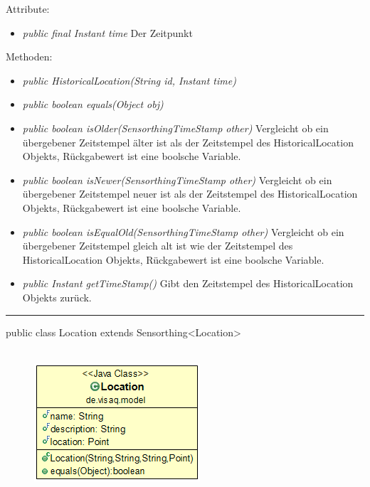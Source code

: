 Attribute:
\begin{itemize} 
	\item \emph{public final Instant time} Der Zeitpunkt
\end{itemize}
Methoden:
\begin{itemize} 
	\item \emph{public HistoricalLocation(String id, Instant time)} 
	\item \emph{public boolean equals(Object obj)} 
	\item \emph{public boolean isOlder(SensorthingTimeStamp other)} Vergleicht ob ein übergebener Zeitstempel älter ist als der Zeitstempel des HistoricalLocation Objekts, Rückgabewert ist eine boolsche Variable.
	\item \emph{public boolean isNewer(SensorthingTimeStamp other)} Vergleicht ob ein übergebener Zeitstempel neuer ist als der Zeitstempel des HistoricalLocation Objekts, Rückgabewert ist eine boolsche Variable.
	\item \emph{public boolean isEqualOld(SensorthingTimeStamp other)} Vergleicht ob ein übergebener Zeitstempel gleich alt ist wie der Zeitstempel des HistoricalLocation Objekts, Rückgabewert ist eine boolsche Variable.
	\item \emph{public Instant getTimeStamp()} Gibt den Zeitstempel des HistoricalLocation Objekts zurück.
\end{itemize}

\rule{\textwidth}{0.4pt}
public class Location extends Sensorthing<Location>
\\\\
\begin{minipage}{0.3\textwidth}
	\begin{figure}[H]
		\includegraphics[scale = 0.5
		]{media/frontend/model/LocationClass.png}
	\end{figure}
\end{minipage} \hfill
\begin{minipage}{0.6\textwidth}
\end{minipage}


